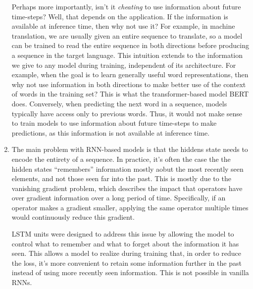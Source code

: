 \documentclass[11pt,a4paper]{article}
\begin{document}
\begin{enumerate}[label=(\alph*)]
          Perhaps more importantly, isn't it \emph{cheating} to use information
          about future time-steps?
          Well, that depends on the application.
          If the information is available at inference time, then why not use
          it?
          For example, in machine translation, we are usually given an entire
          sequence to translate, so a model can be trained to read the entire
          sequence in both directions before producing a sequence in the target
          language.
          This intuition extends to the information we give to any model during
          training, independent of its architecture.
          For example, when the goal is to learn generally useful word
          representations, then why not use information in both directions to
          make better use of the context of words in the training set?
          This is what the transformer-based model BERT does.
          Conversely, when predicting the next word in a sequence, models
          typically have access only to previous words.
          Thus, it would not make sense to train models to use information
          about future time-steps to make predictions, as this information is
          not available at inference time.
    \item The main problem with RNN-based models is that the hiddens state needs
          to encode the entirety of a sequence.
          In practice, it's often the case the the hidden states ``remembers''
          information mostly aobut the most recently seen elements, and not
          those seen far into the past.
          This is mostly due to the vanishing gradient problem, which describes
          the impact that operators have over gradient information over a long
          period of time.
          Specifically, if an operator makes a gradient smaller, applying the
          same operator multiple times would continuously reduce this gradient.

          LSTM units were designed to address this issue by allowing the model
          to control what to remember and what to forget about the information
          it has seen.
          This allows a model to realize during training that, in order to
          reduce the loss, it's more convenient to retain some information
          further in the past instead of using more recently seen information.
          This is not possible in vanilla RNNs.


\end{enumerate}
\end{document}
